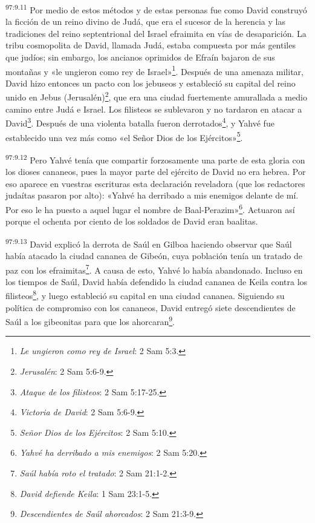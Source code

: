 \par
\textsuperscript{97:9.11} Por medio de estos métodos y de estas personas fue como David construyó la ficción de un reino divino de Judá, que era el sucesor de la herencia y las tradiciones del reino septentrional del Israel efraimita en vías de desaparición. La tribu cosmopolita de David, llamada Judá, estaba compuesta por más gentiles que judíos; sin embargo, los ancianos oprimidos de Efraín bajaron de sus montañas y «le ungieron como rey de Israel»\footnote{\textit{Le ungieron como rey de Israel}: 2 Sam 5:3.}. Después de una amenaza militar, David hizo entonces un pacto con los jebuseos y estableció su capital del reino unido en Jebus (Jerusalén)\footnote{\textit{Jerusalén}: 2 Sam 5:6-9.}, que era una ciudad fuertemente amurallada a medio camino entre Judá e Israel. Los filisteos se sublevaron y no tardaron en atacar a David\footnote{\textit{Ataque de los filisteos}: 2 Sam 5:17-25.}. Después de una violenta batalla fueron derrotados\footnote{\textit{Victoria de David}: 2 Sam 5:6-9.}, y Yahvé fue establecido una vez más como «el Señor Dios de los Ejércitos»\footnote{\textit{Señor Dios de los Ejércitos}: 2 Sam 5:10.}.

\par
\textsuperscript{97:9.12} Pero Yahvé tenía que compartir forzosamente una parte de esta gloria con los dioses cananeos, pues la mayor parte del ejército de David no era hebrea. Por eso aparece en vuestras escrituras esta declaración reveladora (que los redactores judaítas pasaron por alto): «Yahvé ha derribado a mis enemigos delante de mí. Por eso le ha puesto a aquel lugar el nombre de Baal-Perazim»\footnote{\textit{Yahvé ha derribado a mis enemigos}: 2 Sam 5:20.}. Actuaron así porque el ochenta por ciento de los soldados de David eran baalitas.

\par
\textsuperscript{97:9.13} David explicó la derrota de Saúl en Gilboa haciendo observar que Saúl había atacado la ciudad cananea de Gibeón, cuya población tenía un tratado de paz con los efraimitas\footnote{\textit{Saúl había roto el tratado}: 2 Sam 21:1-2.}. A causa de esto, Yahvé lo había abandonado. Incluso en los tiempos de Saúl, David había defendido la ciudad cananea de Keila contra los filisteos\footnote{\textit{David defiende Keila}: 1 Sam 23:1-5.}, y luego estableció su capital en una ciudad cananea. Siguiendo su política de compromiso con los cananeos, David entregó siete descendientes de Saúl a los gibeonitas para que los ahorcaran\footnote{\textit{Descendientes de Saúl ahorcados}: 2 Sam 21:3-9.}.

